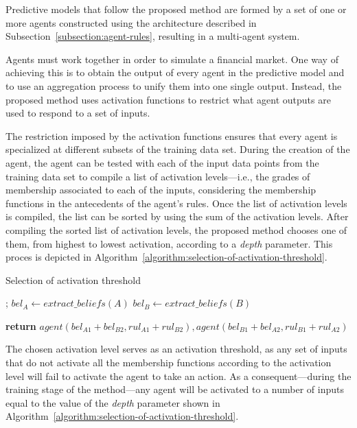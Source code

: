 \documentclass[review]{elsarticle}
\begin{document}
Predictive models that follow the proposed method are formed by a set
of one or more agents constructed using the architecture described in
Subsection~\ref{subsection:agent-rules}, resulting in a multi-agent
system.

Agents must work together in order to simulate a financial market. One
way of achieving this is to obtain the output of every agent in the
predictive model and to use an aggregation process to unify them into
one single output. Instead, the proposed method uses activation
functions to restrict what agent outputs are used to respond to a set
of inputs.

The restriction imposed by the activation functions ensures that every
agent is specialized at different subsets of the training data
set. During the creation of the agent, the agent can be tested with
each of the input data points from the training data set to compile a
list of activation levels---i.e., the grades of membership associated
to each of the inputs, considering the membership functions in the
antecedents of the agent's rules. Once the list of activation levels
is compiled, the list can be sorted by using the sum of the activation
levels. After compiling the sorted list of activation levels, the proposed
method chooses one of them, from highest to lowest activation,
according to a \textit{depth} parameter. This proces is depicted in
Algorithm~\ref{algorithm:selection-of-activation-threshold}.

\begin{algorithm}
\caption{Selection of activation threshold}
    \label{algorithm:selection-of-activation-threshold}
\begin{algorithmic}[1]
    ;
    \State $bel_A\gets extract\_beliefs(A)$
    \State $bel_B\gets extract\_beliefs(B)$

    \State \textbf{return} $agent(bel_{A1} + bel_{B2}, rul_{A1} + rul_{B2}),
    agent(bel_{B1} + bel_{A2}, rul_{B1} + rul_{A2})$
    \EndProcedure
\end{algorithmic}
\end{algorithm}


The chosen activation level serves as an activation threshold, as any set of
inputs that do not activate all the membership functions according to the
activation level will fail to activate the agent to take an action. As a
consequent---during the training stage of the method---any agent will be
activated to a number of inputs equal to the value of the \textit{depth}
parameter shown in Algorithm~\ref{algorithm:selection-of-activation-threshold}.
\end{document}
